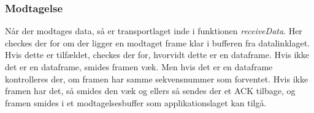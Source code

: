 \subsubsection{Modtagelse}
Når der modtages data, så er transportlaget inde i funktionen \textit{receiveData}. Her checkes der for om der ligger en modtaget frame klar i bufferen fra datalinklaget. Hvis dette er tilfældet, checkes der for, hvorvidt dette er en dataframe. Hvis ikke det er en dataframe, smides framen væk. Men hvis det er en dataframe kontrolleres der, om framen har samme sekvensnummer som forventet. Hvis ikke framen har det, så smides den væk og ellers så sendes der et ACK tilbage, og framen smides i et modtagelsesbuffer som applikationslaget kan tilgå.